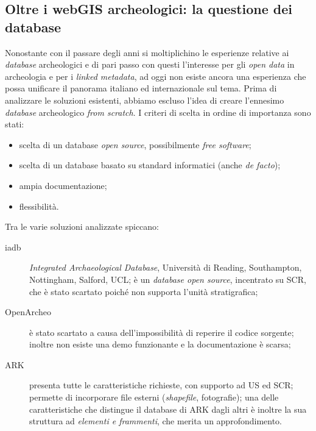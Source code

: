 \documentclass{paper}
\begin{document}
    \subsection{Oltre i webGIS archeologici: la questione dei database}

        Nonostante con il passare degli anni si moltiplichino le esperienze relative ai \textit{database} archeologici e di pari passo con questi l'interesse per gli \textit{open data} in archeologia e per i \textit{linked metadata}, ad oggi non esiste ancora una esperienza che possa unificare il panorama italiano ed internazionale sul tema. Prima di analizzare le soluzioni esistenti, abbiamo escluso l'idea di creare l'ennesimo \textit{database} archeologico \textit{from scratch}. I criteri di scelta in ordine di importanza sono stati:

        \begin{itemize}
            \item scelta di un database \textit{open source}, possibilmente \textit{free software};
            \item scelta di un database basato su standard informatici (anche \textit{de facto});
            \item ampia documentazione;
            \item flessibilità.
        \end{itemize}

        Tra le varie soluzioni analizzate spiccano:

        \begin{description}
            \item[iadb] \textit{Integrated Archaeological Database}, Università di Reading, Southampton, Nottingham, Salford, UCL; è un \textit{database open source}, incentrato su SCR, che è stato scartato poiché non supporta l'unità stratigrafica;
            \item[OpenArcheo] è stato scartato a causa dell'impossibilità di reperire il codice sorgente; inoltre non esiste una demo funzionante e la documentazione è scarsa;
            \item[ARK] presenta tutte le caratteristiche richieste, con supporto ad US ed SCR; permette di incorporare file esterni (\textit{shapefile}, fotografie); una delle caratteristiche che distingue il database di ARK dagli altri è inoltre la sua struttura ad \emph{elementi e frammenti}, che merita un approfondimento.
        \end{description}
\end{document}
